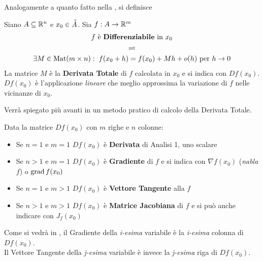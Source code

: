 \noindent Analogamente a quanto fatto nella , si definisce
\begin{definition}[Differenziale]
	\label{def:differenz}
	Siano $A \subseteq \mathbb{R}^n$ e $x_0 \in \accentset{\circ}{A}$. Sia $f: A \to \mathbb{R}^m$
	\begin{equation*}
		\begin{gathered}
			f \text{ è \textbf{Differenziabile} in } x_0\\
			\rightleftharpoons\\
			\exists M \in \operatorname{Mat} (m \times n):\; f(x_0 + h) = f(x_0) + Mh + o(h) \text{ per } h \to 0
		\end{gathered}
	\end{equation*}
	La matrice $M$ è la \textbf{Derivata Totale} di $f$ calcolata in $x_0$ e si indica con $Df(x_0)$. $Df(x_0)$ è l'applicazione \textit{lineare} che meglio approssima la variazione di $f$ nelle vicinanze di $x_0$.
	\begin{note}
		Verrà spiegato più avanti in  un metodo pratico di calcolo della Derivata Totale.
	\end{note}
\end{definition}
\begin{observation}
	\label{obs:matr_deriv_tot}
	Data la matrice $Df(x_0)$ con $m$ righe e $n$ colonne:
	\begin{itemize}
		\item Se $n = 1$ e $m = 1$ $Df(x_0)$ è \textbf{Derivata} di Analisi 1, uno scalare
		\item Se $n > 1$ e $m = 1$ $Df(x_0)$ è \textbf{Gradiente} di $f$ e si indica con $\nabla f(x_0)$ (\textit{nabla} $f$) o $\operatorname{grad} f(x_0)$
		\item Se $n = 1$ e $m > 1$ $Df(x_0)$ è \textbf{Vettore Tangente} alla $f$
		\item Se $n > 1$ e $m > 1$ $Df(x_0)$ è \textbf{Matrice Jacobiana} di $f$ e si può anche indicare con $J_f(x_0)$
	\end{itemize}
	Come si vedrà in , il Gradiente della \textit{i-esima} variabile è la \textit{i-esima} colonna di $Df(x_0)$.\\
	Il Vettore Tangente della \textit{j-esima} variabile è invece la \textit{j-esima} riga di $Df(x_0)$.
\end{observation}

